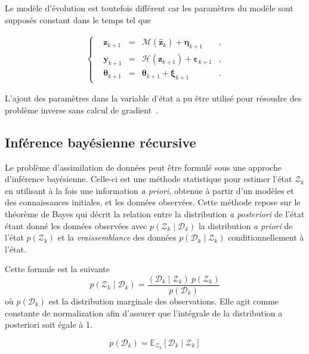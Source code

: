 Le modèle d'évolution est toutefois différent car les paramètres du modèle sont supposés constant dans le temps tel que

\begin{gather*}
    \left\{\begin{aligned}
         & \bm{z}_{k+1}      & = & \mathcal{M}(\hat{\bm{z}}_{k}) + \bm{\eta}_{k+1}    & , \\
         & \bm{y}_{k+1}      & = & \mathcal{H}(\bm{z}_{k+1}) + \bm{\varepsilon}_{k+1} & , \\
         & \bm{\theta}_{k+1} & = & \bm{\theta}_{k+1} + \bm{\xi}_{k+1}                 & .
    \end{aligned} \right.
\end{gather*}

L'ajout des paramètres dans la variable d'état a pu être utilisé pour résoudre des problème inverse sans calcul de gradient~\cite{iglesias_ensemble_2013}.

\subsection{Inférence bayésienne récursive}

Le problème d'assimilation de données peut être formulé sous une approche d'inférence bayésienne. Celle-ci est une méthode statistique pour estimer l'état $\mathcal Z_k$ en utilisant à la fois une information \textit{a priori}, obtenue à partir d'un modèles et des connaissances initiales, et les données observées. Cette méthode repose sur le théorème de Bayes qui décrit la relation entre la distribution \textit{a posteriori} de l'état étant donné les données observées avec $p(\mathcal Z_k \mid \mathcal D_k)$ la distribution \textit{a priori} de l'état $p(\mathcal Z_k)$ et la \textit{vraissemblance} des données $p(\mathcal D_k \mid \mathcal Z_k)$ conditionnellement à l'état.

Cette formule est la suivante
\begin{equation*}
    p(\mathcal Z_k \mid \mathcal D_k) = \frac{(\mathcal D_k \mid \mathcal Z_k)~p(\mathcal Z_k)}{p(\mathcal D_k)}
\end{equation*}où $p(\mathcal D_k)$  est la distribution marginale des observations. Elle agit comme constante de normalization afin d'assurer que l'intégrale de la distribution a posteriori soit égale à 1.

\begin{equation*}
    p(\mathcal D_k) = \mathbb E_{\mathcal Z_k}[\mathcal D_k \mid \mathcal Z_k]
\end{equation*}

